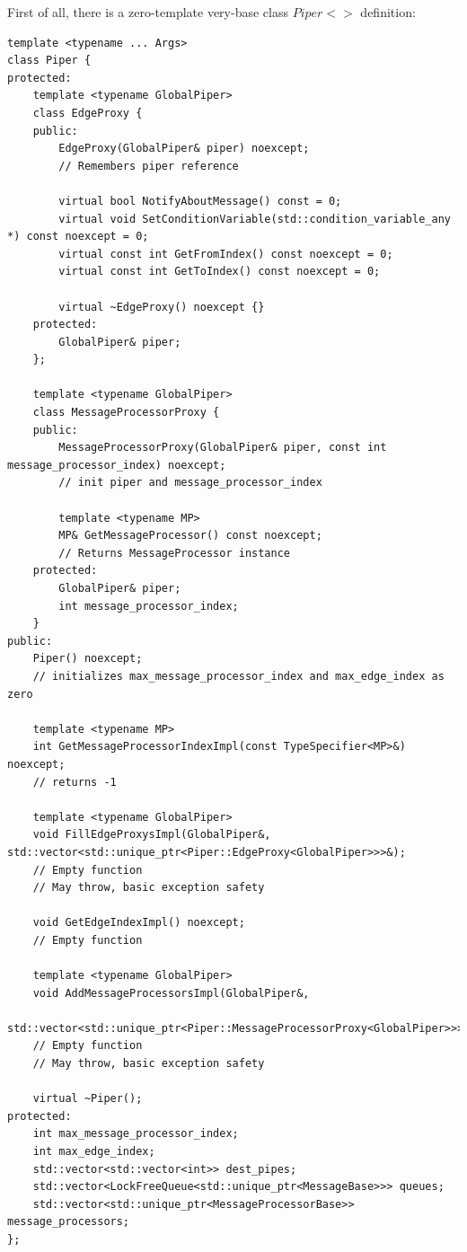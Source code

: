 \documentclass{article}
\begin{document}
First of all, there is a zero-template very-base class $Piper<>$ definition:
\begin{lstlisting}
template <typename ... Args>
class Piper {
protected:
	template <typename GlobalPiper>
	class EdgeProxy {
	public:
		EdgeProxy(GlobalPiper& piper) noexcept;
		// Remembers piper reference

		virtual bool NotifyAboutMessage() const = 0;
		virtual void SetConditionVariable(std::condition_variable_any *) const noexcept = 0;
		virtual const int GetFromIndex() const noexcept = 0;
		virtual const int GetToIndex() const noexcept = 0;

		virtual ~EdgeProxy() noexcept {}
	protected:
		GlobalPiper& piper;
	};

	template <typename GlobalPiper>
	class MessageProcessorProxy {
	public:
		MessageProcessorProxy(GlobalPiper& piper, const int message_processor_index) noexcept;
		// init piper and message_processor_index

		template <typename MP>
		MP& GetMessageProcessor() const noexcept;
		// Returns MessageProcessor instance
	protected:
		GlobalPiper& piper;
		int message_processor_index;
	}
public:
	Piper() noexcept;
	// initializes max_message_processor_index and max_edge_index as zero

	template <typename MP>
	int GetMessageProcessorIndexImpl(const TypeSpecifier<MP>&) noexcept;
	// returns -1

	template <typename GlobalPiper>
	void FillEdgeProxysImpl(GlobalPiper&, std::vector<std::unique_ptr<Piper::EdgeProxy<GlobalPiper>>>&);
	// Empty function
	// May throw, basic exception safety

	void GetEdgeIndexImpl() noexcept;
	// Empty function

	template <typename GlobalPiper>
	void AddMessageProcessorsImpl(GlobalPiper&,
		std::vector<std::unique_ptr<Piper::MessageProcessorProxy<GlobalPiper>>>&);
	// Empty function
	// May throw, basic exception safety

	virtual ~Piper();
protected:
	int max_message_processor_index;
	int max_edge_index;
	std::vector<std::vector<int>> dest_pipes;
	std::vector<LockFreeQueue<std::unique_ptr<MessageBase>>> queues;
	std::vector<std::unique_ptr<MessageProcessorBase>> message_processors;
};
\end{lstlisting}
\end{document}
